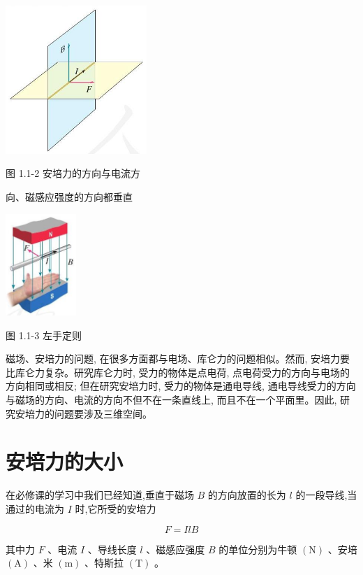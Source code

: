 \documentclass[10pt]{article}
\begin{document}
\begin{center}
\includegraphics[max width=0.4\textwidth]{images/01910e72-c5b7-7ed5-a6d4-fb3a5faefc32_8_910338.jpg}
\end{center}

图 1.1-2 安培力的方向与电流方

向、磁感应强度的方向都垂直

\begin{center}
\includegraphics[max width=0.2\textwidth]{images/01910e72-c5b7-7ed5-a6d4-fb3a5faefc32_8_581765.jpg}
\end{center}

图 1.1-3 左手定则

磁场、安培力的问题, 在很多方面都与电场、库仑力的问题相似。然而, 安培力要比库仑力复杂。研究库仑力时, 受力的物体是点电荷, 点电荷受力的方向与电场的方向相同或相反; 但在研究安培力时, 受力的物体是通电导线, 通电导线受力的方向与磁场的方向、电流的方向不但不在一条直线上, 而且不在一个平面里。因此, 研究安培力的问题要涉及三维空间。

\section*{安培力的大小}

在必修课的学习中我们已经知道,垂直于磁场 \(B\) 的方向放置的长为 \(l\) 的一段导线,当通过的电流为 \(I\) 时,它所受的安培力

\[
F = {IlB}
\]

其中力 \(F\) 、电流 \(I\) 、导线长度 \(l\) 、磁感应强度 \(B\) 的单位分别为牛顿 \(\left( \mathrm{N}\right)\) 、安培 \(\left( \mathrm{A}\right)\) 、米 \(\left( \mathrm{m}\right)\) 、特斯拉 \(\left( \mathrm{T}\right)\) 。
\end{document}
